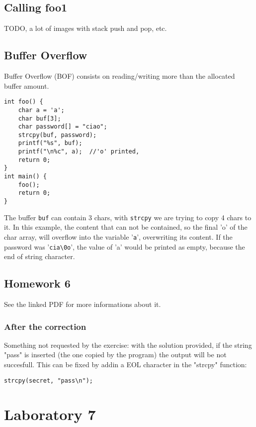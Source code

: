 \documentclass[a4paper, 10pt, titlepage]{article}
\begin{document}
\subsection{Calling foo1}
TODO, a lot of images with stack push and pop, etc.
\subsection{Buffer Overflow}
Buffer Overflow (BOF) consists on reading/writing more than the allocated buffer amount.

\begin{lstlisting}
int foo() {
	char a = 'a';
	char buf[3];
	char password[] = "ciao";
	strcpy(buf, password);
	printf("%s", buf);
    printf("\n%c", a);	//'o' printed,
	return 0;
}
int main() {
	foo();
	return 0;
}
\end{lstlisting}
The buffer \lstinline|buf| can contain 3 chars, with \lstinline|strcpy| we are trying to copy 4 chars to it. In this example, the content that can not be contained, so the final 'o' of the char array, will overflow into the variable '\lstinline|a|', overwriting its content. If the password was '\lstinline|cia\0o|', the value of 'a' would be printed as empty, because the end of string character.

\subsection{Homework 6}
See the linked PDF for more informations about it. 
\subsubsection{After the correction}
Something not requested by the exercise: with the solution provided, if the string "pass" is inserted (the one copied by the program) the output will be not succesfull. This can be fixed by addin a EOL character in the "strcpy" function:
\begin{verbatim}
strcpy(secret, "pass\n");
\end{verbatim}

\section{Laboratory 7}
\end{document}
